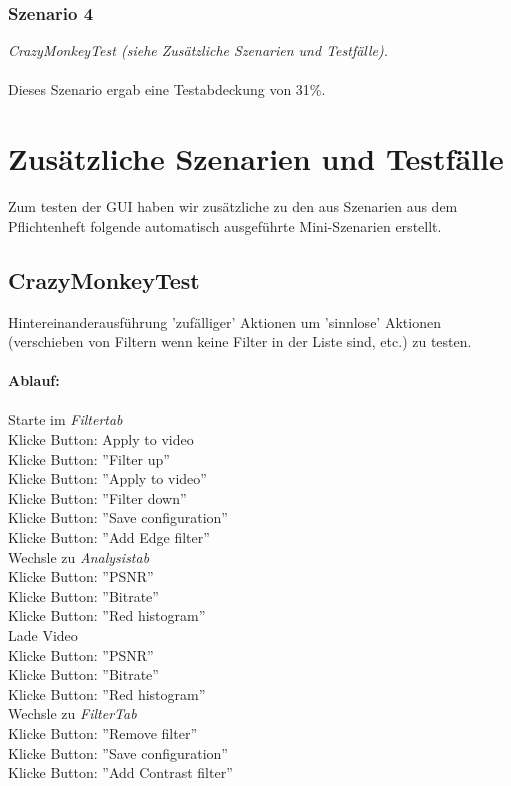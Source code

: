 \documentclass{scrartcl}
\begin{document}
{\subsubsection{Szenario 4}
\textit{CrazyMonkeyTest (siehe Zusätzliche Szenarien und Testfälle).}\\
\\
Dieses Szenario ergab eine Testabdeckung von 31\%.
\newpage
\section{Zusätzliche Szenarien und Testfälle}
Zum testen der GUI haben wir zusätzliche zu den aus Szenarien aus dem Pflichtenheft folgende automatisch ausgeführte Mini-Szenarien erstellt.
\subsection{CrazyMonkeyTest}
Hintereinanderausführung 'zufälliger' Aktionen um 'sinnlose' Aktionen (verschieben von Filtern wenn keine Filter in der Liste sind, etc.) zu testen.\\
\\
\textbf{Ablauf:}\\
\\
Starte im \textit{Filtertab}\\
Klicke Button: Apply to video\\
Klicke Button: ''Filter up''\\
Klicke Button: ''Apply to video''\\
Klicke Button: ''Filter down''\\
Klicke Button: ''Save configuration''\\
Klicke Button: ''Add Edge filter''\\
Wechsle zu \textit{Analysistab}\\
Klicke Button: ''PSNR''\\
Klicke Button: ''Bitrate''\\
Klicke Button: ''Red histogram''\\
Lade Video\\
Klicke Button: ''PSNR''\\
Klicke Button: ''Bitrate''\\
Klicke Button: ''Red histogram''\\
Wechsle zu \textit{FilterTab}\\
Klicke Button: ''Remove filter''\\
Klicke Button: ''Save configuration''\\
Klicke Button: ''Add Contrast filter''\\
}
\end{document}
